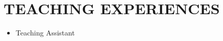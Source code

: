 \documentclass[10pt,a4paper,sans]{moderncv} %
\begin{document}
	\vspace{-2em}
	\section{TEACHING EXPERIENCES}
	\begin{itemize}
		\item Teaching Assistant
		\begin{itemize}
			
%				
%			
%				
%			
%			
%			
			

\end{itemize}
\end{itemize}
\end{document}

